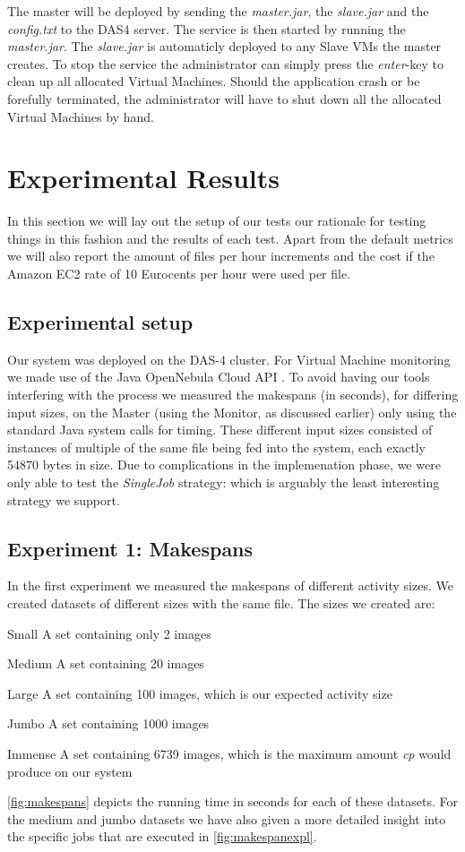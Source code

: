 \documentclass[twocolumn,twoside]{IEEEtran}
\begin{document}
The master will be deployed by sending the \emph{master.jar}, the \emph{slave.jar}
and the \emph{config.txt} to the DAS4 server. The service is then started by
running the \emph{master.jar}. The \emph{slave.jar} is automaticly deployed to
any Slave VMs the master creates. To stop the service the administrator
can simply press the \emph{enter}-key to clean up all allocated Virtual Machines.
Should the application crash or be forefully terminated, the administrator will
have to shut down all the allocated Virtual Machines by hand.

\section{Experimental Results}
\label{sec:setup}
In this section we will lay out the setup of our tests
our rationale for testing things in this fashion and the
results of each test. Apart from the default metrics
we will also report the amount of files per hour increments and 
the cost if the Amazon EC2 rate of 10 Eurocents per
hour were used per file.

\subsection{Experimental setup}
Our system was deployed on the DAS-4 cluster\cite{das4}.
For Virtual Machine monitoring we made use of the 
Java OpenNebula Cloud API \cite{opennebulaapi}.
To avoid having our tools interfering with the process
we measured the makespans (in seconds), for differing
input sizes,
on the Master (using the Monitor, as discussed earlier) only using the standard Java system calls
for timing.
These different input sizes consisted of instances of
multiple of the same file being fed into the system, each exactly 54870 bytes in size. 
Due to complications in the implemenation phase, we were
only able to test the \emph{SingleJob} strategy: which is
arguably the least interesting strategy we support.

\subsection{Experiment 1: Makespans}
In the first experiment we measured the makespans of 
different activity sizes. We created datasets of different
sizes with the same file. The sizes we created are:
\begin{LaTeXdescription}
\item[Small] A set containing only 2 images
\item[Medium] A set containing 20 images
\item[Large] A set containing 100 images, which is our expected activity size
\item[Jumbo] A set containing 1000 images
\item[Immense] A set containing 6739 images, which is the maximum amount \emph{cp} would produce on our system
\end{LaTeXdescription}
\autoref{fig:makespans} depicts the running time in seconds 
for each of these datasets. For the medium and jumbo datasets
we have also given a more detailed insight into the specific
jobs that are executed in \autoref{fig:makespanexpl}.
\end{document}
